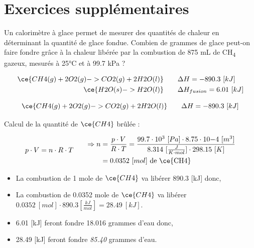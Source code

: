 \documentclass[
  11pt,
  a4paper,
  openany]{book}
\begin{document}
\section{Exercices supplémentaires}\label{exercices-suppluxe9mentaires-14}

\begin{Exercise}

Un calorimètre à glace permet de mesurer des quantités de chaleur en déterminant la quantité de glace fondue. Combien de grammes de glace peut-on faire fondre grâce à la chaleur libérée par la combustion de 875 mL de CH\textsubscript{4} gazeux, mesurés à 25°C et à 99.7 kPa ?

\[
\begin{split}
\ce{CH4(g) + 2 O2(g) -> CO2(g) + 2 H2O(l)} \qquad & \Delta H = - 890.3\ [kJ] \\
\ce{H2O(s) -> H2O(l)} \qquad & \Delta H_{fusion} = 6.01\ [kJ]
\end{split}
\]


\end{Exercise}

\begin{Answer}

\[
\ce{CH4(g) + 2 O2(g) -> CO2(g) + 2 H2O(l)} \qquad \Delta H = - 890.3\ [kJ]
\]

Calcul de la quantité de \(\ce{CH4}\) brûlée :

\[
\begin{split}
p \cdot V = n \cdot R \cdot T
\end{split}
\qquad
\begin{split}
\Rightarrow n &= \frac{p \cdot V}{R \cdot T} = \frac{99.7 \cdot 10^{3}\ [Pa] \cdot 8.75 \cdot 10{-4}\ [m^3]}{8.314\ [\frac{J}{K \cdot mol}] \cdot 298.15\ [K]} \\
 &= 0.0352\ [mol] \text{ de \ce{CH4}}
\end{split}
\]

\begin{itemize}
\item
  La combustion de 1 mole de \(\ce{CH4}\) va libérer 890.3 {[}kJ{]} donc,
\item
  La combustion de 0.0352 mole de \(\ce{CH4}\) va libérer \(0.0352\ [mol] \cdot 890.3 [\frac{kJ}{mol}] = 28.49\ [kJ]\).
\item
  6.01 {[}kJ{]} feront fondre 18.016 grammes d'eau donc,
\item
  28.49 {[}kJ{]} feront fondre \emph{85.40} grammes d'eau.
\end{itemize}

\end{Answer}
\end{document}
